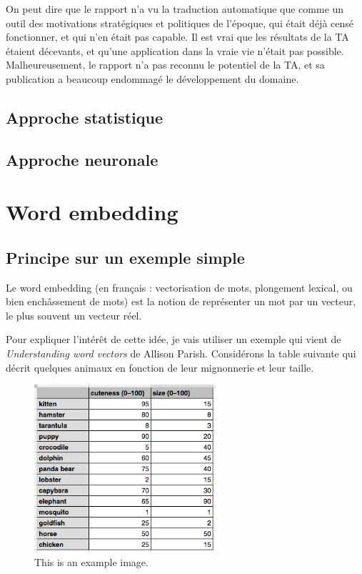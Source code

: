 \documentclass[11pt, a4paper]{report}
\begin{document}
  On peut dire que le rapport n'a vu la traduction automatique que comme un outil des 
  motivations stratégiques et politiques de l'époque, qui était 
  déjà censé fonctionner, et qui n'en était pas capable. Il est vrai que les résultats 
  de la TA étaient décevants, et qu'une application dans la vraie vie n'était pas possible. 
  Malheureusement, le rapport n'a pas reconnu le potentiel de la TA, et sa publication 
  a beaucoup endommagé le développement du domaine.   

  \section*{Approche statistique}
  \section*{Approche neuronale}

\chapter{Word embedding}
  \section*{Principe sur un exemple simple}
Le word embedding (en français : vectorisation de mots, plongement lexical, ou bien enchâssement de mots)
est la notion de représenter un mot par un vecteur, le plus souvent un vecteur réel.

Pour expliquer l'intérêt de cette idée, je vais utiliser un exemple qui vient de 
\textit{Understanding word vectors} de Allison Parish. Considérons la table suivante qui décrit quelques 
animaux en fonction de leur mignonnerie et leur taille. 

\begin{figure}[h]
  \centering
  \includegraphics[width=0.6\textwidth]{animal-table.png}
  \caption{This is an example image.}
  \label{fig:example}
\end{figure}
\end{document}
